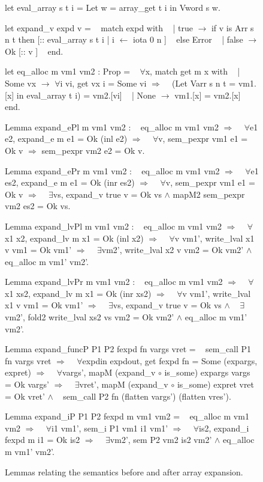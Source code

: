 \documentclass{article}
\begin{document}
\begin{figure}[p]
\obeylines\obeyspaces\ttfamily%
let eval\_array s t i = Let w = array\_get t i in Vword s w.

let expand\_v expd v =
~ match expd with
~ | true  \(\rightarrow\) if v is Arr s n t then [:: eval\_array s t i | i \(\leftarrow\) iota 0 n ]
~   else Error
~ | false \(\rightarrow\) Ok [:: v ]
~ end.

let eq\_alloc m vm1 vm2 : Prop =
~ \(\forall\)x, match get m x with
~ | Some vx \(\rightarrow\) \(\forall\)i vi, get vx i = Some vi \(\Longrightarrow\)
~   (Let Varr s n t = vm1.[x] in eval\_array t i) = vm2.[vi]
~ | None \(\rightarrow\) vm1.[x] = vm2.[x]
~ end.

Lemma expand\_ePl m vm1 vm2 :
~ eq\_alloc m vm1 vm2 \(\Longrightarrow\)
~ \(\forall\)e1 e2, expand\_e m e1 = Ok (inl e2) \(\Longrightarrow\)
~ \(\forall\)v, sem\_pexpr vm1 e1 = Ok v \(\Longrightarrow\) sem\_pexpr vm2 e2 = Ok v.

Lemma expand\_ePr m vm1 vm2 :
~ eq\_alloc m vm1 vm2 \(\Longrightarrow\)
~ \(\forall\)e1 es2, expand\_e m e1 = Ok (inr es2) \(\Longrightarrow\)
~ \(\forall\)v, sem\_pexpr vm1 e1 = Ok v \(\Longrightarrow\)
~ \(\exists\)vs, expand\_v true v = Ok vs \(\wedge\) mapM2 sem\_pexpr vm2 es2 = Ok vs.

Lemma expand\_lvPl m vm1 vm2 :
~ eq\_alloc m vm1 vm2 \(\Longrightarrow\)
~ \(\forall\)x1 x2, expand\_lv m x1 = Ok (inl x2) \(\Longrightarrow\)
~ \(\forall\)v vm1', write\_lval x1 v vm1 = Ok vm1' \(\Longrightarrow\)
~ \(\exists\)vm2', write\_lval x2 v vm2 = Ok vm2' \(\wedge\) eq\_alloc m vm1' vm2'.

Lemma expand\_lvPr m vm1 vm2 :
~ eq\_alloc m vm1 vm2 \(\Longrightarrow\)
~ \(\forall\)x1 xs2, expand\_lv m x1 = Ok (inr xs2) \(\Longrightarrow\)
~ \(\forall\)v vm1', write\_lval x1 v vm1 = Ok vm1' \(\Longrightarrow\)
~ \(\exists\)vs, expand\_v true v = Ok vs \(\wedge\)
~   \(\exists\)vm2', fold2 write\_lval xs2 vs vm2 = Ok vm2' \(\wedge\) eq\_alloc m vm1' vm2'.

Lemma expand\_funcP P1 P2 fexpd fn vargs vret =
~ sem\_call P1 fn vargs vret \(\Longrightarrow\)
~ \(\forall\)expdin expdout, get fexpd fn = Some (expargs, expret) \(\Longrightarrow\)
~ \(\forall\)vargs', mapM (expand\_v \(\circ\) is\_some) expargs vargs = Ok vargs' \(\Longrightarrow\)
~ \(\exists\)vret',  mapM (expand\_v \(\circ\) is\_some) expret  vret  = Ok vret'  \(\wedge\)
~   sem\_call P2 fn (flatten vargs') (flatten vres').

Lemma expand\_iP P1 P2 fexpd m vm1 vm2 =
~ eq\_alloc m vm1 vm2 \(\Longrightarrow\)
~ \(\forall\)i1 vm1', sem\_i P1 vm1 i1 vm1' \(\Longrightarrow\)
~ \(\forall\)is2, expand\_i fexpd m i1 = Ok is2 \(\Longrightarrow\)
~ \(\exists\)vm2', sem P2 vm2 is2 vm2' \(\wedge\) eq\_alloc m vm1' vm2'.
\normalfont%
\caption{Lemmas relating the semantics before and after array expansion.}
\end{figure}
\end{document}
